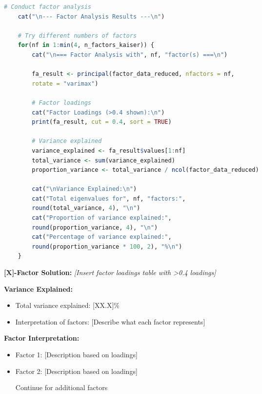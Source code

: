 \begin{lstlisting}[language=R, caption=Factor Analysis Implementation, breaklines=true]
	# Conduct factor analysis
	cat("\n--- Factor Analysis Results ---\n")
	
	# Try different numbers of factors
	for(nf in 1:min(4, n_factors_kaiser)) {
		cat("\n=== Factor Analysis with", nf, "factor(s) ===\n")
		
		fa_result <- principal(factor_data_reduced, nfactors = nf, 
		rotate = "varimax")
		
		# Factor loadings
		cat("Factor Loadings (>0.4 shown):\n")
		print(fa_result, cut = 0.4, sort = TRUE)
		
		# Variance explained
		variance_explained <- fa_result$values[1:nf]
		total_variance <- sum(variance_explained)
		proportion_variance <- total_variance / ncol(factor_data_reduced)
		
		cat("\nVariance Explained:\n")
		cat("Total eigenvalues for", nf, "factors:", 
		round(total_variance, 4), "\n")
		cat("Proportion of variance explained:", 
		round(proportion_variance, 4), "\n")
		cat("Percentage of variance explained:", 
		round(proportion_variance * 100, 2), "%\n")
	}
\end{lstlisting}

\textbf{[X]-Factor Solution:}
\textit{[Insert factor loadings table with >0.4 loadings]}

\textbf{Variance Explained:}
\begin{itemize}
	\item Total variance explained: [XX.X]\%
	\item Interpretation of factors: [Describe what each factor represents]
\end{itemize}

\textbf{Factor Interpretation:}
\begin{itemize}
	\item Factor 1: [Description based on loadings]
	\item Factor 2: [Description based on loadings]
	\item [Continue for additional factors]
\end{itemize}